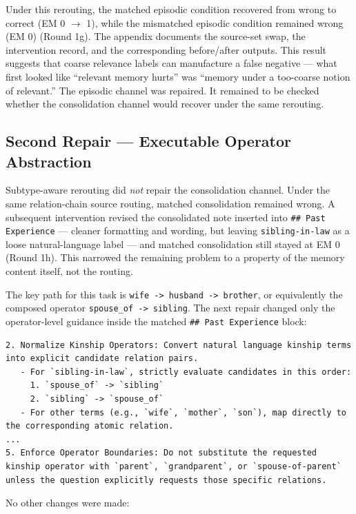 \documentclass[11pt]{article}
\begin{document}
Under this rerouting, the matched episodic condition recovered from wrong to correct (EM 0 $\rightarrow$ 1), while the mismatched episodic condition remained wrong (EM 0) (Round 1g). The appendix documents the source-set swap, the intervention record, and the corresponding before/after outputs. This result suggests that coarse relevance labels can manufacture a false negative --- what first looked like ``relevant memory hurts'' was ``memory under a too-coarse notion of relevant.'' The episodic channel was repaired. It remained to be checked whether the consolidation channel would recover under the same rerouting.

\subsection{Second Repair --- Executable Operator Abstraction}

Subtype-aware rerouting did \emph{not} repair the consolidation channel. Under the same relation-chain source routing, matched consolidation remained wrong. A subsequent intervention revised the consolidated note inserted into \texttt{\#\# Past Experience} --- cleaner formatting and wording, but leaving \texttt{sibling-in-law} as a loose natural-language label --- and matched consolidation still stayed at EM 0 (Round 1h). This narrowed the remaining problem to a property of the memory content itself, not the routing.

The key path for this task is \texttt{wife -> husband -> brother}, or equivalently the composed operator \texttt{spouse\_of -> sibling}. The next repair changed only the operator-level guidance inside the matched \texttt{\#\# Past Experience} block:

\begin{lstlisting}
2. Normalize Kinship Operators: Convert natural language kinship terms into explicit candidate relation pairs.
   - For `sibling-in-law`, strictly evaluate candidates in this order:
     1. `spouse_of` -> `sibling`
     2. `sibling` -> `spouse_of`
   - For other terms (e.g., `wife`, `mother`, `son`), map directly to the corresponding atomic relation.
...
5. Enforce Operator Boundaries: Do not substitute the requested kinship operator with `parent`, `grandparent`, or `spouse-of-parent` unless the question explicitly requests those specific relations.
\end{lstlisting}

No other changes were made:
\end{document}
